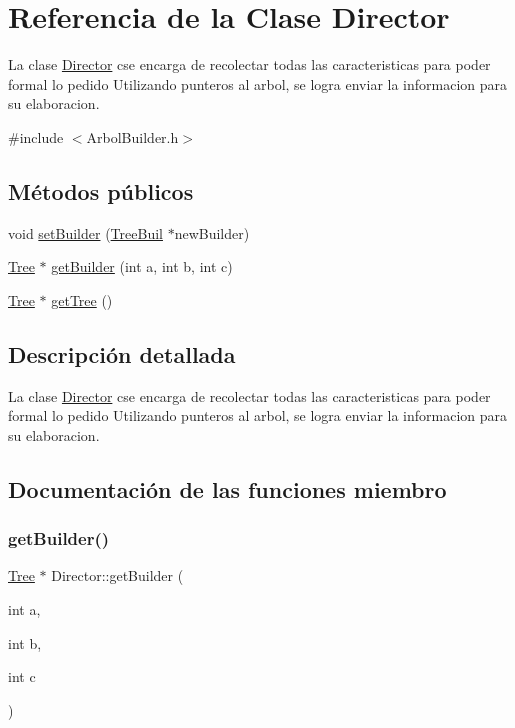 \hypertarget{classDirector}{}\section{Referencia de la Clase Director}
\label{classDirector}


La clase \hyperlink{classDirector}{Director} cse encarga de recolectar todas las caracteristicas para poder formal lo pedido  Utilizando punteros al arbol, se logra enviar la informacion para su elaboracion.  




{\ttfamily \#include $<$Arbol\+Builder.\+h$>$}

\subsection*{Métodos públicos}
\begin{DoxyCompactItemize}
\item 
void \hyperlink{classDirector_a08d3ffc5c9323cc649ba603f4b2d0758}{set\+Builder} (\hyperlink{classTreeBuil}{Tree\+Buil} $\ast$new\+Builder)
\item 
\hyperlink{classTree}{Tree} $\ast$ \hyperlink{classDirector_aeffbc977843b757e6514c91c2b040074}{get\+Builder} (int a, int b, int c)
\item 
\hyperlink{classTree}{Tree} $\ast$ \hyperlink{classDirector_aa05d4a6f7847d53486824d640654a952}{get\+Tree} ()
\end{DoxyCompactItemize}


\subsection{Descripción detallada}
La clase \hyperlink{classDirector}{Director} cse encarga de recolectar todas las caracteristicas para poder formal lo pedido  Utilizando punteros al arbol, se logra enviar la informacion para su elaboracion. 

\subsection{Documentación de las funciones miembro}
\mbox{\label{classDirector_aeffbc977843b757e6514c91c2b040074}} 
\subsubsection{\texorpdfstring{get\+Builder()}{getBuilder()}}
{\footnotesize\ttfamily \hyperlink{classTree}{Tree} $\ast$ Director\+::get\+Builder (\begin{DoxyParamCaption}\item[{int}]{a,  }\item[{int}]{b,  }\item[{int}]{c }\end{DoxyParamCaption})}

